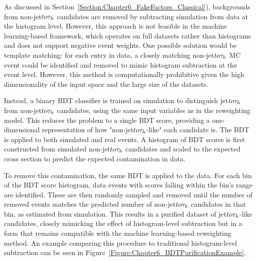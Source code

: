 As discussed in Section~\ref{Section:Chapter6_FakeFactors_Classical}), backgrounds from non-jet$to\tau_h$ candidates are removed by subtracting simulation from data at the histogram level. However, this approach is not feasible in the machine learning-based framework, which operates on full datasets rather than histograms and does not support negative event weights. One possible solution would be template matching: for each entry in data, a closely matching non-jet$to\tau_h$ MC event could be identified and removed to mimic histogram subtraction at the event level. However, this method is computationally prohibitive given the high dimensionality of the input space and the large size of the datasets.

Instead, a binary BDT classifier is trained on simulation to distinguish jet$to\tau_h$ from non-jet$to\tau_h$ candidates, using the same input variables as in the reweighting model. This reduces the problem to a single BDT score, providing a one-dimensional representation of how "non-jet$to\tau_h$-like" each candidate is. The BDT is applied to both simulated and real events. A histogram of BDT scores is first constructed from simulated non-jet$to\tau_h$ candidates and scaled to the expected cross section to predict the expected contamination in data.

To remove this contamination, the same BDT is applied to the data. For each bin of the BDT score histogram, data events with scores falling within the bin's range are identified. These are then randomly sampled and removed until the number of removed events matches the predicted number of non-jet$to\tau_h$ candidates in that bin, as estimated from simulation. This results in a purified dataset of jet$to\tau_h$-like candidates, closely mimicking the effect of histogram-level subtraction but in a form that remains compatible with the machine learning-based reweighting method. An example comparing this procedure to traditional histogram-level subtraction can be seen in Figure~\ref{Figure:Chapter6_BDTPurificationExample}.


